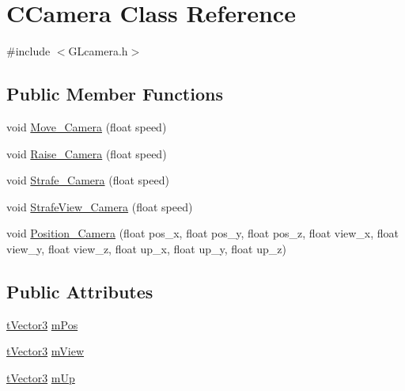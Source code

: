 \hypertarget{class_c_camera}{\section{C\+Camera Class Reference}
\label{class_c_camera}
}


{\ttfamily \#include $<$G\+Lcamera.\+h$>$}

\subsection*{Public Member Functions}
\begin{DoxyCompactItemize}
\item 
void \hyperlink{class_c_camera_a072c50e18f8af53898749d006de038bf}{Move\+\_\+\+Camera} (float speed)
\item 
void \hyperlink{class_c_camera_af7b7fc6cc102a0a2df29238b93405e9c}{Raise\+\_\+\+Camera} (float speed)
\item 
void \hyperlink{class_c_camera_ab794f291bdde7dedb4502c8a30e27a44}{Strafe\+\_\+\+Camera} (float speed)
\item 
void \hyperlink{class_c_camera_adbb8fa3e17ab03f678390bfa1e291239}{Strafe\+View\+\_\+\+Camera} (float speed)
\item 
void \hyperlink{class_c_camera_a77ecbd62fe41b04938a51d51ce07da26}{Position\+\_\+\+Camera} (float pos\+\_\+x, float pos\+\_\+y, float pos\+\_\+z, float view\+\_\+x, float view\+\_\+y, float view\+\_\+z, float up\+\_\+x, float up\+\_\+y, float up\+\_\+z)
\end{DoxyCompactItemize}
\subsection*{Public Attributes}
\begin{DoxyCompactItemize}
\item 
\hyperlink{structt_vector3}{t\+Vector3} \hyperlink{class_c_camera_ab38cdbfdbb298cbaf93d1982112d4091}{m\+Pos}
\item 
\hyperlink{structt_vector3}{t\+Vector3} \hyperlink{class_c_camera_a7014fff6f0458dae9b5f97ecdb5e3ab0}{m\+View}
\item 
\hyperlink{structt_vector3}{t\+Vector3} \hyperlink{class_c_camera_a95a552f343e871b3afd969b39781b04d}{m\+Up}
\end{DoxyCompactItemize}


